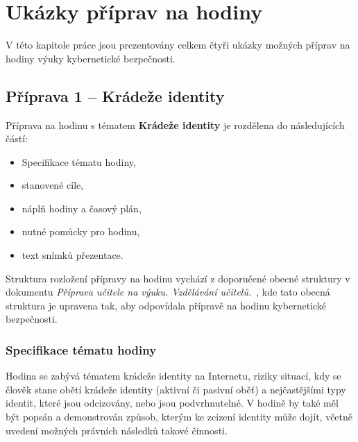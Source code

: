 \documentclass[a4paper, 12pt]{article}
\begin{document}
\newpage
\section{Ukázky příprav na hodiny}
V této kapitole práce jsou prezentovány celkem čtyři ukázky možných příprav na hodiny výuky kybernetické bezpečnosti.

\subsection{Příprava 1 -- Krádeže identity}
Příprava na hodinu s tématem \textbf{Krádeže identity} je rozdělena do následujících částí:
    \begin{itemize}
        \setlength{\itemsep}{-3pt}
        \item Specifikace tématu hodiny,
        \item stanovené cíle,
        \item náplň hodiny a časový plán,
        \item nutné pomůcky pro hodinu,
        \item text snímků přezentace.
    \end{itemize}

Struktura rozložení přípravy na hodinu vychází z doporučené obecné struktury v dokumentu \textit{Příprava učitele na výuku. Vzdělávání učitelů.}~\cite{presentationPavlaZ}, kde tato obecná struktura je upravena tak, aby odpovídala přípravě na hodinu kybernetické bezpečnosti.

\subsubsection{Specifikace tématu hodiny}
Hodina se zabývá tématem krádeže identity na Internetu, riziky situací, kdy se člověk stane obětí krádeže identity (aktivní či pasivní oběť) a nejčastějšími typy identit, které jsou odcizovány, nebo jsou podvrhnutelné. V hodině by také měl být popsán a demonstrován způsob, kterým ke zcizení identity může dojít, včetně uvedení možných právních následků takové činnosti.
\end{document}
